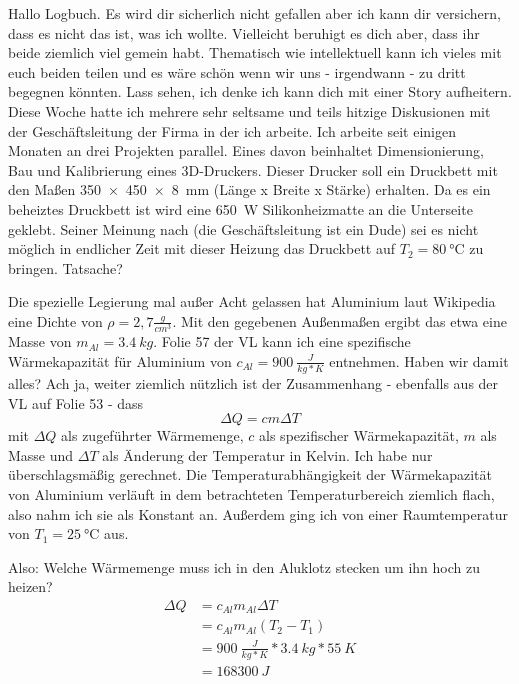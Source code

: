 Hallo Logbuch. Es wird dir sicherlich nicht gefallen aber ich kann dir versichern, dass es
nicht das ist, was ich wollte. Vielleicht beruhigt es dich aber, dass ihr beide ziemlich
viel gemein habt. Thematisch wie intellektuell kann ich vieles mit euch beiden teilen
und es wäre schön wenn wir uns - irgendwann - zu dritt begegnen könnten. Lass sehen, ich denke
ich kann dich mit einer Story aufheitern. Diese Woche hatte ich mehrere sehr seltsame und
teils hitzige Diskusionen mit der Geschäftsleitung der Firma in der ich arbeite. Ich arbeite
seit einigen Monaten an drei Projekten parallel. Eines davon beinhaltet Dimensionierung, Bau
und Kalibrierung eines 3D-Druckers. Dieser Drucker soll ein Druckbett mit den Maßen \SI{350x450x8}{mm}
(Länge x Breite x Stärke) erhalten. Da es ein beheiztes Druckbett ist wird eine \SI{650}{W}
Silikonheizmatte an die Unterseite geklebt. Seiner Meinung nach (die Geschäftsleitung ist ein Dude)
sei es nicht möglich in endlicher Zeit mit dieser Heizung das Druckbett auf \(T_2 = \SI{80}{\celsius}\) zu bringen.
Tatsache?\par
Die spezielle Legierung mal außer Acht gelassen hat Aluminium laut Wikipedia eine Dichte von
\( \rho = 2,7 \frac{g}{cm^{3}}\). Mit den gegebenen Außenmaßen ergibt das etwa eine Masse von
\(m_{Al} = \SI{3,4}{kg}\). Folie 57 der VL kann ich eine spezifische Wärmekapazität für Aluminium
von \(c_{Al} = \SI{900}{\frac{J}{kg*K}}\) entnehmen. Haben wir damit alles? Ach ja, weiter ziemlich nützlich
ist der Zusammenhang - ebenfalls aus der VL auf Folie 53 - dass
\begin{equation}
    \Delta Q = cm \Delta T
\end{equation}
mit \(\Delta Q\) als zugeführter Wärmemenge, \(c\) als spezifischer Wärmekapazität, \(m\) als Masse und \(\Delta T\) als
Änderung der Temperatur in Kelvin. Ich habe nur überschlagsmäßig gerechnet. Die Temperaturabhängigkeit 
der Wärmekapazität von Aluminium verläuft in dem betrachteten Temperaturbereich ziemlich flach, also nahm ich sie
als Konstant an. Außerdem ging ich von einer Raumtemperatur von \(T_1 = \SI{25}{\celsius}\) aus.\par
Also: Welche Wärmemenge muss ich in den Aluklotz stecken um ihn hoch zu heizen?
\begin{align}
    \Delta Q    &= c_{Al}m_{Al}\Delta T \nonumber \\
                &= c_{Al}m_{Al}(T_2 - T_1) \nonumber \\
                &= \SI{900}{\frac{J}{kg*K} * \SI{3,4}{kg} * \SI{55}{K}} \nonumber \\
                &= \SI{168300}{J} \nonumber
\end{align}

